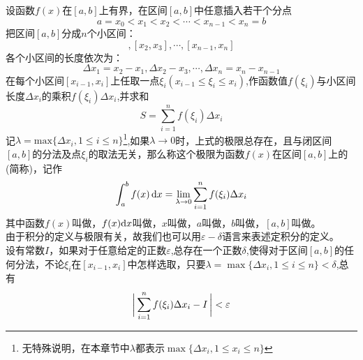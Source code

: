 \vspace*{-1em}
设函数$f(x)$在$[a,b]$上有界，在区间$[a,b]$中任意插入若干个分点
\begin{equation}
	\nonumber
	a=x_0<x_1<x_2<\cdots<x_{n-1}<x_n=b
\end{equation}
把区间$[a,b]$分成$n$个小区间：
\begin{equation}
	[x_1,x_2],[x_2,x_3],\cdots,[x_{n-1},x_n]
\end{equation}
各个小区间的长度依次为：
\begin{equation}
	\nonumber
	\Delta x_1=x_2-x_1,\Delta x_2-x_3,\cdots,\Delta x_n=x_n-x_{n-1}
\end{equation}
在每个小区间$[x_{i-1},x_i]$上任取一点$\xi_i(x_{i-1}\leq \xi_i\leq x_i)$,作函数值$f(\xi_i)$与小区间长度$\Delta x_i$的乘积$f(\xi_i)\Delta x_i$,并求和
\begin{equation}
	S=\sum_{i=1}^{n}f(\xi_i)\Delta x_i
\end{equation}
\hspace*{2em} 记$\lambda=\text{max}\{\Delta x_i,1\leq i\leq n\}$\footnote{无特殊说明，在本章节中$\lambda$都表示$\max \{\Delta x_i,1\leq x_i\leq n\}$},如果$\lambda\to 0$时，上式的极限总存在，且与闭区间$[a,b]$的分法及点$\xi_i$的取法无关，那么称这个极限为函数$f(x)$在区间$[a,b]$上的(简称)，记作
\begin{equation}
	\int_{a}^{b}f(x)\,{\rm{d}} x=\lim\limits_{\lambda\to0}\sum_{i=1}^{n}f(\xi_i)\Delta x_i
\end{equation}
\hspace*{2em} 其中函数$f(x)$叫做，$f(x){\rm{d}} x$叫做，$x$叫做，$a$叫做，$b$叫做，$[a,b]$叫做。\\
\hspace*{2em} 由于积分的定义与极限有关，故我们也可以用$\varepsilon-\delta$语言来表述定积分的定义。
\\ \hspace*{2em} 设有常数$I$，如果对于任意给定的正数$\varepsilon$,总存在一个正数$\delta$,使得对于区间$[a,b]$的任何分法，不论$\xi_i$在$[x_{i-1},x_i]$中怎样选取，只要$\lambda=\max\{\Delta x_i,1\leq i\leq n\}<\delta$,总有
\begin{equation}
	\bigg|\sum_{i=1}^{n}f(\xi_i)\Delta x_i-I \,\bigg|<\varepsilon\vspace*{-1em}
\end{equation}
